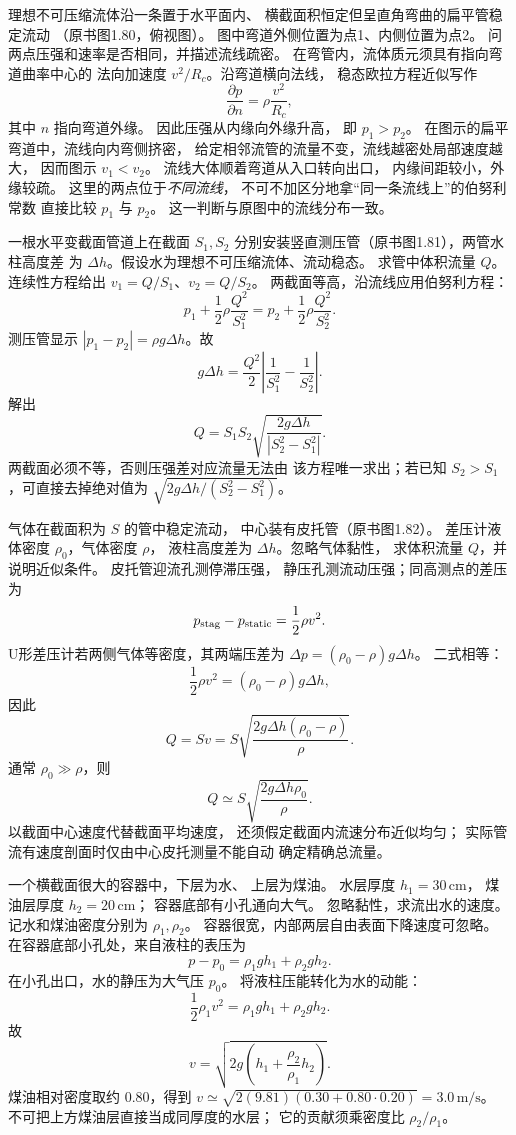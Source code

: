 理想不可压缩流体沿一条置于水平面内、
横截面积恒定但呈直角弯曲的扁平管稳定流动
（原书图1.80，俯视图）。
图中弯道外侧位置为点1、内侧位置为点2。
问两点压强和速率是否相同，并描述流线疏密。
\exsolution
在弯管内，流体质元须具有指向弯道曲率中心的
法向加速度 $v^2/R_c$。沿弯道横向法线，
稳态欧拉方程近似写作
\[
\frac{\partial p}{\partial n}
=\rho\frac{v^2}{R_c},
\]
其中 $n$ 指向弯道外缘。
因此压强从内缘向外缘升高，
即 $\boxed{p_1>p_2}$。
在图示的扁平弯道中，流线向内弯侧挤密，
给定相邻流管的流量不变，流线越密处局部速度越大，
因而图示 $\boxed{v_1<v_2}$。
流线大体顺着弯道从入口转向出口，
内缘间距较小，外缘较疏。
\excheck 这里的两点位于\emph{不同流线}，
不可不加区分地拿“同一条流线上”的伯努利常数
直接比较 $p_1$ 与 $p_2$。
这一判断与原图中的流线分布一致。

一根水平变截面管道上在截面 $S_1,S_2$
分别安装竖直测压管（原书图1.81），两管水柱高度差
为 $\Delta h$。假设水为理想不可压缩流体、流动稳态。
求管中体积流量 $Q$。
\exsolution
连续性方程给出
$v_1=Q/S_1$、$v_2=Q/S_2$。
两截面等高，沿流线应用伯努利方程：
\[
p_1+\frac12\rho\frac{Q^2}{S_1^2}
=p_2+\frac12\rho\frac{Q^2}{S_2^2}.
\]
测压管显示
$|p_1-p_2|=\rho g\Delta h$。故
\[
g\Delta h=\frac{Q^2}{2}
\left|\frac1{S_1^2}-\frac1{S_2^2}\right|.
\]
解出
\[
\boxed{Q=S_1S_2\sqrt{
\frac{2g\Delta h}{|S_2^2-S_1^2|}}}.
\]
\excheck 两截面必须不等，否则压强差对应流量无法由
该方程唯一求出；若已知
$S_2>S_1$，可直接去掉绝对值为
$\sqrt{2g\Delta h/(S_2^2-S_1^2)}$。

气体在截面积为 $S$ 的管中稳定流动，
中心装有皮托管（原书图1.82）。
差压计液体密度 $\rho_0$，气体密度 $\rho$，
液柱高度差为 $\Delta h$。忽略气体黏性，
求体积流量 $Q$，并说明近似条件。
\exsolution
皮托管迎流孔测停滞压强，
静压孔测流动压强；同高测点的差压为
\[
p_{\rm stag}-p_{\rm static}=\frac12\rho v^2.
\]
U形差压计若两侧气体等密度，其两端压差为
$\Delta p=(\rho_0-\rho)g\Delta h$。
二式相等：
\[
\frac12\rho v^2=(\rho_0-\rho)g\Delta h,
\]
因此
\[
\boxed{Q=Sv=S\sqrt{
\frac{2g\Delta h(\rho_0-\rho)}{\rho}}}.
\]
通常 $\rho_0\gg\rho$，则
\[
\boxed{Q\simeq S\sqrt{\frac{2g\Delta h\rho_0}{\rho}}}.
\]
\excheck 以截面中心速度代替截面平均速度，
还须假定截面内流速分布近似均匀；
实际管流有速度剖面时仅由中心皮托测量不能自动
确定精确总流量。

一个横截面很大的容器中，下层为水、
上层为煤油。
水层厚度 $h_1=30\,\mathrm{cm}$，
煤油层厚度 $h_2=20\,\mathrm{cm}$；
容器底部有小孔通向大气。
忽略黏性，求流出水的速度。
\exsolution
记水和煤油密度分别为 $\rho_1,\rho_2$。
容器很宽，内部两层自由表面下降速度可忽略。
在容器底部小孔处，来自液柱的表压为
\[
p-p_0=\rho_1gh_1+\rho_2gh_2.
\]
在小孔出口，水的静压为大气压 $p_0$。
将液柱压能转化为水的动能：
\[
\frac12\rho_1v^2
=\rho_1gh_1+\rho_2gh_2.
\]
故
\[
\boxed{v=\sqrt{2g\left(
h_1+\frac{\rho_2}{\rho_1}h_2\right)}}.
\]
煤油相对密度取约 $0.80$，得到
$v\simeq\sqrt{2(9.81)(0.30+0.80\cdot0.20)}
=\boxed{3.0\,\mathrm{m/s}}$。
\excheck 不可把上方煤油层直接当成同厚度的水层；
它的贡献须乘密度比 $\rho_2/\rho_1$。

